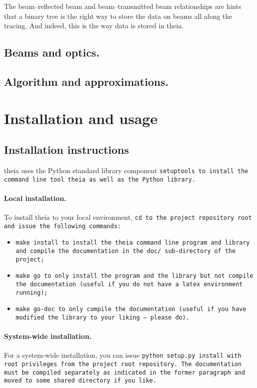 \documentclass{article}
\begin{document}
The beam--reflected beam and beam--transmitted beam relationships are hints that a binary tree is the right way to store the data on beams all along the tracing. And indeed, this is the way data is stored in theia.

\subsection{Beams and optics.}
\subsection{Algorithm and approximations.}

\section{Installation and usage}
\subsection{Installation instructions}
theia uses the Python standard library component \tt{setuptools} to install the command line tool theia as well as the Python library. 

\paragraph{Local installation.}To install theia to your local environment, \tt{cd} to the project repository root and issue the following commands:

\begin{itemize}
\item \tt{make install} to install the theia command line program and library and compile the documentation in the \tt{doc/} sub-directory of the project;
\item \tt{make go} to only install the program and the library but not compile the documentation (useful if you do not have a latex environment running);
\item \tt{make go-doc} to only compile the documentation (useful if you have modified the library to your liking -- please do).
\end{itemize}


\paragraph{System-wide installation.}For a system-wide installation, you can issue \tt{python setup.py install} with root privileges from the project root repository. The documentation must be compiled separately as indicated in the former paragraph and moved to some shared directory if you like.
\end{document}
